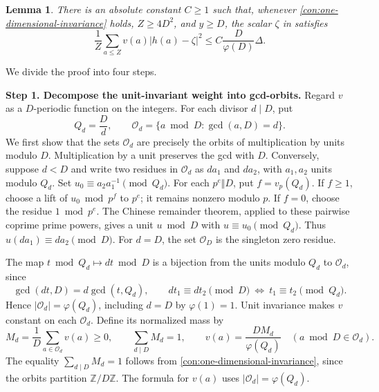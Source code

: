 \documentclass[twoside]{aomart}
\makeatletter
\theoremstyle{paperplain}
\newtheorem{lemma}[theorem]{Lemma}
\theoremstyle{paperdefinition}
\renewenvironment{proof}[1][\proofname]{\par\pushQED{\qed}%
  \normalfont\topsep6\p@\@plus3\p@\relax\trivlist
  \item[\hskip\labelsep\itshape #1\@addpunct{.}]\ignorespaces
}{\popQED\endtrivlist\@endpefalse}
\newcommand{\Z}{\mathbb Z}
\numberwithin{equation}{section}
\makeatother
\begin{document}
\begin{lemma}
\label{con:invariant-weight}
There is an absolute constant $C\ge1$ such that, whenever
\eqref{con:one-dimensional-invariance} holds,
$Z\ge4D^2$, and $y\ge D$, the scalar $\zeta$ in
 satisfies
\begin{equation}
 \frac1Z\sum_{a\le Z}v(a)|h(a)-\zeta|^2
 \le C\frac D{\varphi(D)}\Delta.
 \label{con:weighted-prefix}
\end{equation}
\end{lemma}

\begin{proof}
We divide the proof into four steps.

\medskip
\noindent\textbf{Step 1. Decompose the unit-invariant weight into gcd-orbits.}
Regard $v$ as a $D$-periodic function on the integers.
For each divisor $d\mid D$, put
\begin{equation*}
 Q_d=\frac Dd,\qquad
 \mathcal O_d=\{a\bmod D:\gcd(a,D)=d\}.
 \end{equation*}
We first show that the sets $\mathcal O_d$ are precisely the
orbits of multiplication by units modulo $D$.
Multiplication by a unit preserves the gcd with $D$.
Conversely, suppose $d<D$ and write two residues in $\mathcal O_d$
as $da_1$ and $da_2$, with $a_1,a_2$ units modulo $Q_d$.
Set $u_0\equiv a_2a_1^{-1}\pmod{Q_d}$.
For each $p^e\Vert D$, put $f=v_p(Q_d)$.
If $f\ge1$, choose a lift of $u_0\bmod p^f$ to $p^e$;
it remains nonzero modulo $p$.
If $f=0$, choose the residue $1\bmod p^e$.
The Chinese remainder theorem, applied to these pairwise coprime
prime powers, gives a unit $u\bmod D$ with $u\equiv u_0\pmod{Q_d}$.
Thus $u(da_1)\equiv da_2\pmod D$.
For $d=D$, the set $\mathcal O_D$ is the singleton zero residue.

The map $t\bmod Q_d\mapsto dt\bmod D$ is a bijection from the
units modulo $Q_d$ to $\mathcal O_d$, since
\begin{equation}
 \gcd(dt,D)=d\gcd(t,Q_d),\qquad
 dt_1\equiv dt_2\pmod D
 \ \Longleftrightarrow\ t_1\equiv t_2\pmod{Q_d}.
 \label{con:gcd-orbit-bijection}
\end{equation}
Hence $|\mathcal O_d|=\varphi(Q_d)$, including $d=D$ by
$\varphi(1)=1$.
Unit invariance makes $v$ constant on each $\mathcal O_d$.
Define its normalized mass by
\begin{equation}
 M_d=\frac1D\sum_{a\in\mathcal O_d}v(a)\ge0,\qquad \sum_{d\mid D}M_d=1,\qquad v(a)=\frac{DM_d}{\varphi(Q_d)}\quad(a\bmod D\in\mathcal O_d).
 \label{con:gcd-orbit-masses}
\end{equation}
The equality $\sum_{d\mid D}M_d=1$ follows from
\eqref{con:one-dimensional-invariance}, since the orbits partition
$\Z/D\Z$. The formula for $v(a)$ uses $|\mathcal O_d|=\varphi(Q_d)$.


\end{proof}
\end{document}
